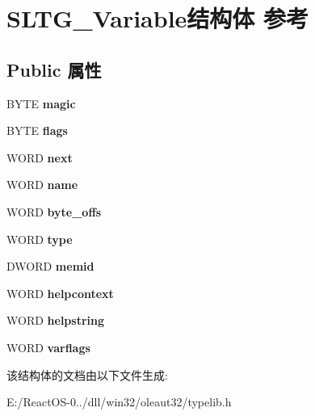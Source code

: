 \hypertarget{struct_s_l_t_g___variable}{}\section{S\+L\+T\+G\+\_\+\+Variable结构体 参考}
\label{struct_s_l_t_g___variable}
\subsection*{Public 属性}
\begin{DoxyCompactItemize}
\item 
\mbox{\label{struct_s_l_t_g___variable_a466a8cc01881cc60b0d8fa55c655b5ab}} 
B\+Y\+TE {\bfseries magic}
\item 
\mbox{\label{struct_s_l_t_g___variable_a42963b8874a45a68eae259bf4f4eb284}} 
B\+Y\+TE {\bfseries flags}
\item 
\mbox{\label{struct_s_l_t_g___variable_a912f9663e4c6e92affa13b8f387c7b31}} 
W\+O\+RD {\bfseries next}
\item 
\mbox{\label{struct_s_l_t_g___variable_ad39b41065835ee2260279d153106322e}} 
W\+O\+RD {\bfseries name}
\item 
\mbox{\label{struct_s_l_t_g___variable_a04a4197d6b0c8ed0d0f3c6bdc7ce928b}} 
W\+O\+RD {\bfseries byte\+\_\+offs}
\item 
\mbox{\label{struct_s_l_t_g___variable_a9fb72e505091dbe7e5d6739c56fde0bb}} 
W\+O\+RD {\bfseries type}
\item 
\mbox{\label{struct_s_l_t_g___variable_a9b5c5fc3be64c32b9bfa382326cb7748}} 
D\+W\+O\+RD {\bfseries memid}
\item 
\mbox{\label{struct_s_l_t_g___variable_af525a48f74c46518969e660b8911d3e8}} 
W\+O\+RD {\bfseries helpcontext}
\item 
\mbox{\label{struct_s_l_t_g___variable_af71c02b6bf7a031c90f044b7aaf8b077}} 
W\+O\+RD {\bfseries helpstring}
\item 
\mbox{\label{struct_s_l_t_g___variable_a780e6f3eae71daa36acb1b55fbbd88d7}} 
W\+O\+RD {\bfseries varflags}
\end{DoxyCompactItemize}


该结构体的文档由以下文件生成\+:\begin{DoxyCompactItemize}
\item 
E\+:/\+React\+O\+S-\/0../dll/win32/oleaut32/typelib.\+h\end{DoxyCompactItemize}
